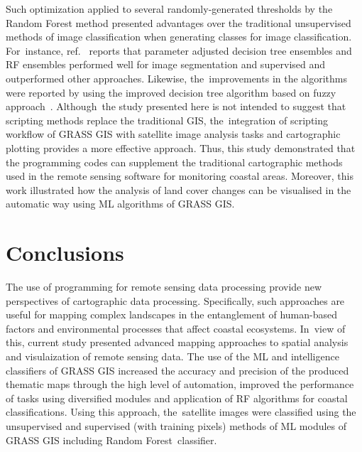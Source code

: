 \documentclass[coasts,article,accept,pdftex,oneauthor]{Definitions/mdpi}
\begin{document}
Such optimization {applied to} several randomly-generated thresholds by the Random Forest method {presented} advantages over the traditional unsupervised methods of image classification when generating classes for image classification. For~instance, ref.~\cite{PASQUARELLA2023103561} reports that parameter adjusted decision tree ensembles and {RF} ensembles performed well for image segmentation and supervised and outperformed other approaches. Likewise, the~improvements in the algorithms were reported by using {the }improved decision tree algorithm based on{ }fuzzy approach~\cite{ALOBEIDAT20151192}. Although~the study presented here is not intended to suggest that scripting methods replace the traditional GIS, the~integration of scripting workflow of GRASS GIS with satellite image analysis tasks and cartographic plotting provides a more effective approach. Thus, this study demonstrated that the programming codes can supplement the traditional cartographic methods used in the remote sensing software for monitoring coastal areas. Moreover, this work illustrated how the analysis of land cover changes can be visualised in the automatic way using ML algorithms of GRASS GIS. 
\section{Conclusions}

{The use of programming for remote sensing data processing provide new perspectives of cartographic data processing. Specifically, such approaches are useful for mapping complex landscapes in the entanglement of human-based factors and environmental processes that affect coastal ecosystems. In~view of this, current study presented advanced mapping approaches to spatial analysis and visulaization of remote sensing data}. {The} use of the ML and intelligence classifiers of GRASS GIS increased the accuracy and precision of the produced thematic maps through the high level of automation, improved the performance of tasks using diversified modules and application of RF algorithms for coastal classifications. {Using this approach}, the~{satellite }images were classified using {the }unsupervised and supervised (with training pixels) methods of ML modules of GRASS GIS including Random Forest~classifier. 
\end{document}
